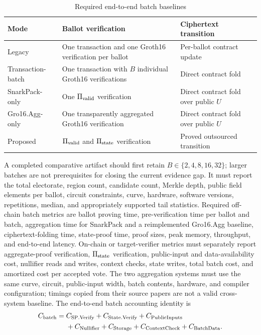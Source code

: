 \documentclass[pdflatex,sn-mathphys-num]{sn-jnl}%
\theoremstyle{thmstyleone}%
\theoremstyle{thmstyletwo}%
\theoremstyle{thmstylethree}%
\begin{document}
\begin{table}[htbp]
\centering
\caption{Required end-to-end batch baselines}
\label{tab:batch-baselines}
\begin{tabular}{|p{}|p{}|p{}|}
\hline
\textbf{Mode} & \textbf{Ballot verification} & \textbf{Ciphertext transition} \\ \hline
Legacy & One transaction and one Groth16 verification per ballot & Per-ballot contract update \\ \hline
Transaction-batch & One transaction with $B$ individual Groth16 verifications & Direct contract fold \\ \hline
SnarkPack-only & One $\Pi_{\rm valid}$ verification & Direct contract fold over public $U$ \\ \hline
Gro16.Agg-only & One transparently aggregated Groth16 verification & Direct contract fold over public $U$ \\ \hline
Proposed & $\Pi_{\rm valid}$ and $\Pi_{\rm state}$ verification & Proved outsourced transition \\ \hline
\end{tabular}
\end{table}

A completed comparative artifact should first retain $B\in\{2,4,8,16,32\}$; larger batches are not prerequisites for closing the current evidence gap. It must report the total electorate, region count, candidate count, Merkle depth, public field elements per ballot, circuit constraints, curve, hardware, software versions, repetitions, median, and appropriately supported tail statistics. Required off-chain batch metrics are ballot proving time, pre-verification time per ballot and batch, aggregation time for SnarkPack and a reimplemented Gro16.Agg baseline, ciphertext-folding time, state-proof time, proof sizes, peak memory, throughput, and end-to-end latency. On-chain or target-verifier metrics must separately report aggregate-proof verification, $\Pi_{\rm state}$ verification, public-input and data-availability cost, nullifier reads and writes, context checks, state writes, total batch cost, and amortized cost per accepted vote. The two aggregation systems must use the same curve, circuit, public-input width, batch contents, hardware, and compiler configuration; timings copied from their source papers are not a valid cross-system baseline.  The end-to-end batch accounting identity is
\[
\begin{aligned}
 C_{\rm batch}={}&C_{\rm SP.Verify}+C_{\rm State.Verify}
 +C_{\rm PublicInputs}\\
 &+C_{\rm Nullifier}+C_{\rm Storage}
 +C_{\rm ContextCheck}+C_{\rm BatchData}.
\end{aligned}
\]
\end{document}
